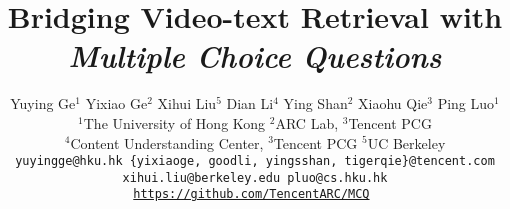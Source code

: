 \documentclass[10pt,twocolumn,letterpaper]{article}
\begin{document}
\title{Bridging Video-text Retrieval with \emph{Multiple Choice Questions}}
	
	\author{Yuying Ge$^1$ \quad
		Yixiao Ge$^2$ \quad
		Xihui Liu$^5$ \quad
		Dian Li$^4$ \quad
		Ying Shan$^2$ \quad
		Xiaohu Qie$^3$ \quad
		Ping Luo$^1$ \quad\\
		{$^1$The University of Hong Kong} \quad 
		{$^2$ARC Lab, $^3$Tencent PCG}  \quad\\
		{$^4$Content Understanding Center, $^3$Tencent PCG}  \quad
		{$^5$UC Berkeley}\\
		\tt\small{yuyingge@hku.hk \quad \{yixiaoge, goodli, yingsshan, tigerqie\}@tencent.com}\\
		\tt\small{xihui.liu@berkeley.edu \quad pluo@cs.hku.hk}\\
		\vspace{5pt}
		{\small \url{https://github.com/TencentARC/MCQ}}
	}
	
\end{document}
